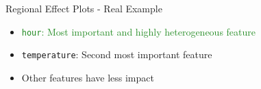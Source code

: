 \documentclass[11pt,compress,t,notes=noshow, aspectratio=169, xcolor=table,dvipsnames]{beamer}
\begin{document}
\begin{frame}{Regional Effect Plots - Real Example}
\begin{figure}
\end{figure}
\begin{itemize}
    \item<2> \textcolor{ForestGreen}{\texttt{hour}: Most important and highly heterogeneous feature}
    \item<2> \texttt{temperature}: Second most important feature
    \item<2> Other features have less impact
\end{itemize}
\end{frame}
\end{document}
